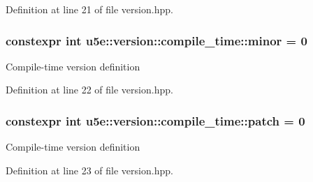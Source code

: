 Definition at line 21 of file version.\+hpp.

\subsubsection[{\texorpdfstring{minor}{minor}}]{\setlength{\rightskip}{0pt plus 5cm}constexpr int u5e\+::version\+::compile\+\_\+time\+::minor = 0}\hypertarget{namespaceu5e_1_1version_1_1compile__time_aa78edd034bf2288b19857e7c5fa4902c}{}\label{namespaceu5e_1_1version_1_1compile__time_aa78edd034bf2288b19857e7c5fa4902c}
Compile-\/time version definition 

Definition at line 22 of file version.\+hpp.

\subsubsection[{\texorpdfstring{patch}{patch}}]{\setlength{\rightskip}{0pt plus 5cm}constexpr int u5e\+::version\+::compile\+\_\+time\+::patch = 0}\hypertarget{namespaceu5e_1_1version_1_1compile__time_ab8ec01673d09045da55c873aa59c1a22}{}\label{namespaceu5e_1_1version_1_1compile__time_ab8ec01673d09045da55c873aa59c1a22}
Compile-\/time version definition 

Definition at line 23 of file version.\+hpp.

